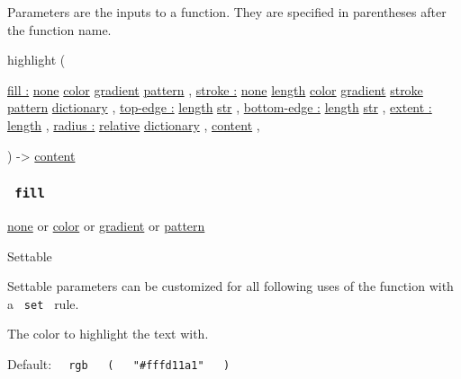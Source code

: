 \label{parameters-tooltip}
Parameters are the inputs to a function. They are specified in
parentheses after the function name.

{ highlight } (

{ \hyperref[parameters-fill]{fill :}
\href{/docs/reference/foundations/none/}{none}
\href{/docs/reference/visualize/color/}{color}
\href{/docs/reference/visualize/gradient/}{gradient}
\href{/docs/reference/visualize/pattern/}{pattern} , } {
\hyperref[parameters-stroke]{stroke :}
\href{/docs/reference/foundations/none/}{none}
\href{/docs/reference/layout/length/}{length}
\href{/docs/reference/visualize/color/}{color}
\href{/docs/reference/visualize/gradient/}{gradient}
\href{/docs/reference/visualize/stroke/}{stroke}
\href{/docs/reference/visualize/pattern/}{pattern}
\href{/docs/reference/foundations/dictionary/}{dictionary} , } {
\hyperref[parameters-top-edge]{top-edge :}
\href{/docs/reference/layout/length/}{length}
\href{/docs/reference/foundations/str/}{str} , } {
\hyperref[parameters-bottom-edge]{bottom-edge :}
\href{/docs/reference/layout/length/}{length}
\href{/docs/reference/foundations/str/}{str} , } {
\hyperref[parameters-extent]{extent :}
\href{/docs/reference/layout/length/}{length} , } {
\hyperref[parameters-radius]{radius :}
\href{/docs/reference/layout/relative/}{relative}
\href{/docs/reference/foundations/dictionary/}{dictionary} , } {
\href{/docs/reference/foundations/content/}{content} , }

) -\textgreater{} \href{/docs/reference/foundations/content/}{content}

\subsubsection{\texorpdfstring{\texttt{\ fill\ }}{ fill }}\label{parameters-fill}

\href{/docs/reference/foundations/none/}{none} {or}
\href{/docs/reference/visualize/color/}{color} {or}
\href{/docs/reference/visualize/gradient/}{gradient} {or}
\href{/docs/reference/visualize/pattern/}{pattern}

{{ Settable }}

\label{parameters-fill-settable-tooltip}
Settable parameters can be customized for all following uses of the
function with a \texttt{\ set\ } rule.

The color to highlight the text with.

Default:
\texttt{\ }{\texttt{\ rgb\ }}\texttt{\ }{\texttt{\ (\ }}\texttt{\ }{\texttt{\ "\#fffd11a1"\ }}\texttt{\ }{\texttt{\ )\ }}\texttt{\ }

